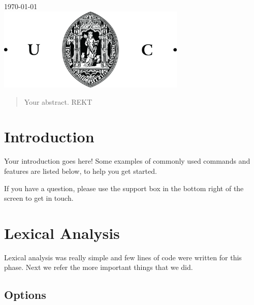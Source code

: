 \documentclass[12pt]{article}
\begin{document}
\begin{titlepage}
{\large \today}\\[2cm] %


\includegraphics [width=9cm]{logo.jpg}\\[1cm] %
 

\vfill %

\end{titlepage}


\begin{abstract}
Your abstract. REKT
\end{abstract}

\section{Introduction}

Your introduction goes here! Some examples of commonly used commands and features are listed below, to help you get started.

If you have a question, please use the support box in the bottom right of the screen to get in touch. 

\newpage

\section{Lexical Analysis}

Lexical analysis was really simple and few lines of code were written for this phase. Next we refer the more important things that we did.\\

\subsection{Options}
\end{document}

